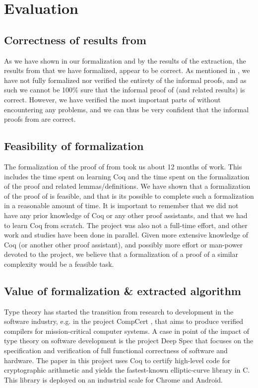 \chapter{Evaluation}

\section{Correctness of results from \cite{mbezem}}

As we have shown in our formalization and by the results of the
extraction, the results from \cite{mbezem} that we have formalized, appear to be correct.
As mentioned in , we have not fully formalized nor verified the entirety of the informal proofs,
and as such we cannot be 100\% sure that the informal proof of  (and related results) is correct.
However, we have verified the most important parts of  without
encountering any problems, and we can thus be very confident that the informal proofs from \cite{mbezem} are correct.

\section{Feasibility of formalization}
\label{sec:feasibility_of_formalization}

The formalization of the proof of  from \cite{mbezem} took us about 12 months of work.
This includes the time spent on learning Coq and the time spent on the formalization of the proof
and related lemmas/definitions.
We have shown that a formalization of the proof of  is feasible,
and that is its possible to complete such a formalization in a reasonable amount of time.
It is important to remember that we did not have any prior knowledge of Coq or any other proof assistants,
and that we had to learn Coq from scratch.
The project was also not a full-time effort, and other work and studies have been done in parallel.
Given more extensive knowledge of Coq (or another other proof assistant),
and possibly more effort or man-power devoted to the project,
we believe that a formalization of a proof of a similar complexity would be a feasible task.

\section{Value of formalization \& extracted algorithm}

Type theory has started the transition from research to development in
the software industry, e.g. in the project CompCert \cite{compcert},
that aims to produce verified compilers for mission-critical computer systems.
A case in point of the impact of type theory on software development is the project Deep Spec
\cite{deepspec} that focuses on the specification and verification of full functional
correctness of software and hardware. The paper \cite{secpriv} in this project uses Coq to certify high-level
code for cryptographic arithmetic and yields the fastest-known elliptic-curve library in C.
This library is deployed on an industrial scale for Chrome and Android.

